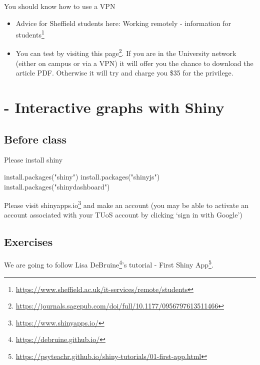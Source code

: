 \documentclass[
  12pt,
  a5paper,
]{book}
\newenvironment{Shaded}{\begin{snugshade}}{\end{snugshade}}
\newcommand{\FunctionTok}[1]{\textcolor[rgb]{0.00,0.00,0.00}{#1}}
\newcommand{\NormalTok}[1]{#1}
\newcommand{\StringTok}[1]{\textcolor[rgb]{0.31,0.60,0.02}{#1}}
\DeclareRobustCommand{\href}[2]{#2\footnote{\url{#1}}}
\providecommand{\tightlist}{%
  \setlength{\itemsep}{0pt}\setlength{\parskip}{0pt}}
\begin{document}
You should know how to use a VPN

\begin{itemize}
\tightlist
\item
  Advice for Sheffield students here: \href{https://www.sheffield.ac.uk/it-services/remote/students}{Working remotely - information for students}
\item
  You can test by visiting \href{https://journals.sagepub.com/doi/full/10.1177/0956797613511466}{this page}. If you are in the University network (either on campus or via a VPN) it will offer you the chance to download the article PDF. Otherwise it will try and charge you \$35 for the privilege.
\end{itemize}

\hypertarget{interactive-graphs-with-shiny}{%
\chapter*{- Interactive graphs with Shiny}\label{interactive-graphs-with-shiny}}


\hypertarget{before-class}{%
\section{Before class}\label{before-class}}

Please install shiny

\begin{Shaded}
\begin{Highlighting}[]
\FunctionTok{install.packages}\NormalTok{(}\StringTok{"shiny"}\NormalTok{)}
\FunctionTok{install.packages}\NormalTok{(}\StringTok{"shinyjs"}\NormalTok{)}
\FunctionTok{install.packages}\NormalTok{(}\StringTok{"shinydashboard"}\NormalTok{)}
\end{Highlighting}
\end{Shaded}

Please visit \href{https://www.shinyapps.io/}{shinyapps.io} and make an account (you may be able to activate an account associated with your TUoS account by clicking `sign in with Google')

\hypertarget{exercises-5}{%
\section{Exercises}\label{exercises-5}}

We are going to follow \href{https://debruine.github.io/}{Lisa DeBruine}'s tutorial - \href{https://psyteachr.github.io/shiny-tutorials/01-first-app.html}{First Shiny App}.
\end{document}
